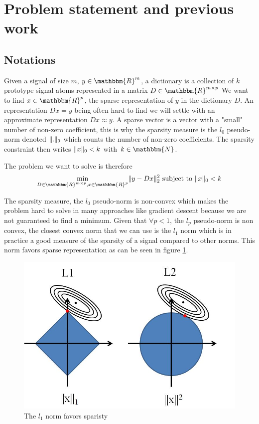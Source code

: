 \documentclass[a4paper,11pt]{article}
\newcommand{\RR}{\mathbbm{R}} %
\DeclarePairedDelimiter\norm{\lVert}{\rVert} %
\begin{document}

\section{Problem statement and previous work}
\subsection{Notations}
Given a signal of size $m$, \textbf{$y \in \RR^m$}, a dictionary is a collection of $k$ prototype signal atoms represented in a matrix $D \in \RR^{m \times p}$
We want to find $x \in \RR^p$, the sparse representation of $y$ in the dictionary $D$.
An representation $D x = y$ being often hard to find we will settle with an approximate representation $ D x \approx y$.
A sparse vector is a vector with a "small" number of non-zero coefficient, this is why the sparsity measure is the $l_0$ pseudo-norm denoted $\norm{.}_0$ which counts the number of non-zero coefficients.
The sparsity constraint then writes $\norm{x}_0<k$ with $k \in \mathbbm{N}$.

The problem we want to solve is therefore
$$\min\limits_{D \in \RR^{m \times p}, x \in \RR^p} \norm{y - Dx}_2^2  \text{  subject to  } \norm{x}_0<k$$


The sparsity measure, the $l_0$ pseudo-norm is non-convex which makes the problem hard to solve in many approaches like gradient descent because we are not guaranteed to find a minimum.
Given that $\forall p <1$, the $l_p$ pseudo-norm is non convex, the closest convex norm that we can use is the $l_1$ norm which is in practice a good measure of the sparsity of a signal compared to other norms.
This norm favors sparse representation as can be seen in figure \ref{l1l2_norm}.

\begin{figure}[!htbp]
\centering
  \includegraphics[width=0.5\linewidth]{l1l2_norm.jpg}
  \caption{The $l_1$ norm favors sparisty}
  \label{l1l2_norm}
\end{figure}
\end{document}
